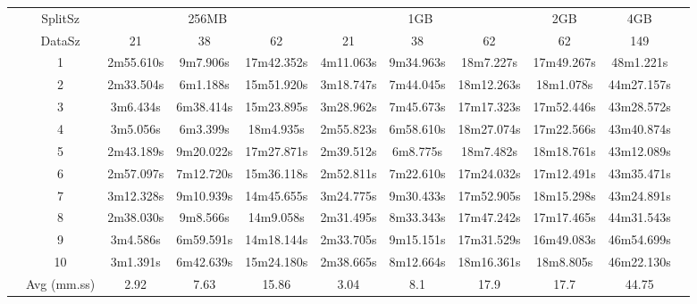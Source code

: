 \begin{tabularx}{\linewidth}{c|c|c|c|c|c|c|c|c|c|l}
\cline{2-10}
& SplitSz 
& \multicolumn{3}{c|}{256MB} & \multicolumn{3}{c|}{1GB}  & \multicolumn{1}{c|}{2GB} & \multicolumn{1}{c|}{4GB} \\
\cline{2-10}
& DataSz 
& 21 & 38 & 62 & 21 & 38 & 62 & 62 & 149 \\
\cline{2-10}
& 1
& 2m55.610s & 9m7.906s & 17m42.352s & 4m11.063s & 9m34.963s & 18m7.227s & 17m49.267s & 48m1.221s \\
\cline{2-10}
& 2
& 2m33.504s & 6m1.188s & 15m51.920s & 3m18.747s & 7m44.045s & 18m12.263s & 18m1.078s & 44m27.157s \\
\cline{2-10}
& 3
& 3m6.434s & 6m38.414s & 15m23.895s & 3m28.962s & 7m45.673s & 17m17.323s & 17m52.446s & 43m28.572s \\
\cline{2-10}
& 4
& 3m5.056s & 6m3.399s & 18m4.935s & 2m55.823s & 6m58.610s & 18m27.074s & 17m22.566s & 43m40.874s \\
\cline{2-10}
& 5
& 2m43.189s & 9m20.022s & 17m27.871s & 2m39.512s & 6m8.775s & 18m7.482s & 18m18.761s & 43m12.089s \\
\cline{2-10}
& 6
& 2m57.097s & 7m12.720s & 15m36.118s & 2m52.811s & 7m22.610s & 17m24.032s & 17m12.491s & 43m35.471s \\
\cline{2-10}
& 7
& 3m12.328s & 9m10.939s & 14m45.655s & 3m24.775s & 9m30.433s & 17m52.905s & 18m15.298s & 43m24.891s \\
\cline{2-10}
& 8
& 2m38.030s & 9m8.566s & 14m9.058s & 2m31.495s & 8m33.343s & 17m47.242s & 17m17.465s & 44m31.543s \\
\cline{2-10}
& 9
& 3m4.586s & 6m59.591s & 14m18.144s & 2m33.705s	& 9m15.151s & 17m31.529s & 16m49.083s & 46m54.699s \\
\cline{2-10}
& 10
& 3m1.391s & 6m42.639s & 15m24.180s & 2m38.665s & 8m12.664s & 18m16.361s & 18m8.805s & 46m22.130s \\
\cline{2-10}
& Avg (mm.ss)
& 2.92 & 7.63 & 15.86 & 3.04 & 8.1 & 17.9 & 17.7 & 44.75 \\
\cline{2-10}
\end{tabularx}
